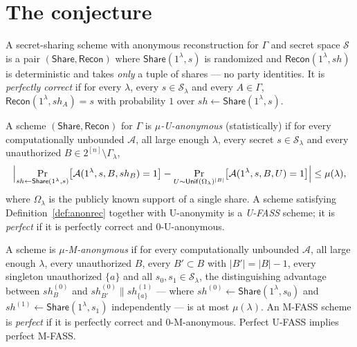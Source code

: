 \documentclass{aicr-conjecture}
\newcommand{\Sh}{\mathcal{S}}
\newcommand{\Share}{\mathsf{Share}}
\newcommand{\Recon}{\mathsf{Recon}}
\newcommand{\Unif}{\mathsf{Unif}}
\begin{document}
\section{The conjecture}\label{sec:conjectures}

\begin{definition}\label{def:anonrec}
A secret-sharing scheme with anonymous reconstruction for $\Gamma$ and
secret space $\Sh$ is a pair $(\Share, \Recon)$ where
$\Share(1^{\lambda}, s)$ is randomized and $\Recon(1^{\lambda}, sh)$ is
deterministic and takes \emph{only} a tuple of shares --- no party
identities. It is \emph{perfectly correct} if for every $\lambda$, every
$s \in \Sh_{\lambda}$ and every $A \in \Gamma$,
$\Recon(1^{\lambda}, sh_{A}) = s$ with probability $1$ over $sh
\leftarrow \Share(1^{\lambda}, s)$.
\end{definition}

\begin{definition}
  \label{def:uanon}
A scheme $(\Share, \Recon)$ for $\Gamma$ is \emph{$\mu$-U-anonymous}
(statistically) if for every computationally unbounded $\mathcal{A}$, all
large enough $\lambda$, every secret $s \in \Sh_{\lambda}$ and every
unauthorized $B \in 2^{[n]} \setminus \Gamma_{\lambda}$,
\[
  \Bigl| \Pr_{sh \leftarrow \Share(1^{\lambda},s)}\bigl[
  \mathcal{A}(1^{\lambda}, s, B, sh_{B}) = 1 \bigr]
  - \Pr_{U \sim \Unif(\Omega_{\lambda})^{|B|}}\bigl[
  \mathcal{A}(1^{\lambda}, s, B, U) = 1 \bigr] \Bigr| \le \mu(\lambda),
\]
where $\Omega_{\lambda}$ is the publicly known support of a single share.
A scheme satisfying Definition~\ref{def:anonrec} together with
U-anonymity is a \emph{U-FASS} scheme; it is \emph{perfect} if it is
perfectly correct and $0$-U-anonymous.
\end{definition}

\begin{definition}\label{def:manon}
A scheme is \emph{$\mu$-M-anonymous} if for every computationally
unbounded $\mathcal{A}$, all large enough $\lambda$, every unauthorized
$B$, every $B' \subset B$ with $|B'| = |B| - 1$, every singleton
unauthorized $\{a\}$ and all $s_{0}, s_{1} \in \Sh_{\lambda}$, the
distinguishing advantage between $sh^{(0)}_{B}$ and $sh^{(0)}_{B'} \|
sh^{(1)}_{\{a\}}$ --- where $sh^{(0)} \leftarrow
\Share(1^{\lambda},s_{0})$ and $sh^{(1)} \leftarrow
\Share(1^{\lambda},s_{1})$ independently --- is at most $\mu(\lambda)$.
An M-FASS scheme is \emph{perfect} if it is perfectly correct and
$0$-M-anonymous. Perfect U-FASS implies perfect M-FASS\@.
\end{definition}
\end{document}
